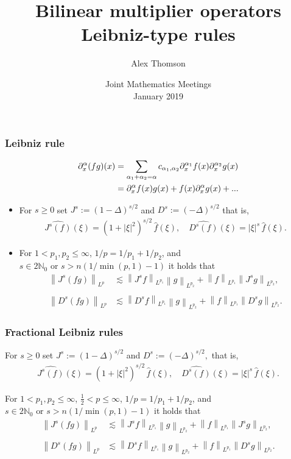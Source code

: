 \documentclass[xcolor=dvipsnames]{beamer}
\title[Leibniz-type rules]{Bilinear multiplier operators Leibniz-type rules}
\author[Alex Thomson]{Alex Thomson}
\institute[Kansas State University]{
Department of Mathematics \\
Kansas State University
 }
\date[January 2019]{Joint Mathematics Meetings\\ January 2019}
\newcommand{\na}{\mathbb{N}}
\newcommand{\fr}[2]{{\textstyle \frac{#1}{#2}}}
\newcommand{\norm}[2]{{\left\| #1 \right\|}_{#2}}
\newcommand{\hcline}{1/p=1/p_1+1/p_2}
\begin{document}
\begin{frame}[plain]
  \titlepage
\end{frame}


\begin{frame}\frametitle{Leibniz rule}
\begin{align*}
\partial^\alpha_x(fg)(x) & = \sum_{\alpha_1 + \alpha_2 = \alpha} c_{\alpha_1,\alpha_2} \partial^{\alpha_1}_x f(x) \partial^{\alpha_2}_x g(x)\\ \medskip
& =\partial^\alpha_x f(x) g(x) + f(x) \partial^\alpha_x g(x) + ...
\end{align*}

\begin{itemize}
\item For $s \ge 0$ set $J^s:=(1-\Delta)^{s/2}$  and  $D^s:=(-\Delta)^{s/2}$ that is,
\begin{align*}
\widehat{J^s(f)}(\xi) =(1+|\xi|^2)^{s/2} \,\hat{f}(\xi),\quad \widehat{D^s(f)}(\xi) =|\xi|^s \,\hat{f}(\xi).
\end{align*}
\item For $1<p_1,p_2\le \infty$, $\hcline$, and $s\in 2\na_0 \text{ or } s>n({1}/{\min(p,1)}-1)$ it holds that \begin{align*}
 \norm{J^s(fg)}{L^p} &\lesssim  \norm{J^sf}{L^{p_1}} \norm{g}{L^{p_2}}+ \norm{f}{L^{p_1}} \norm{J^sg}{L^{p_2}},\\
 &\\
   \norm{D^s(fg)}{L^p} &\lesssim  \norm{D^sf}{L^{p_1}} \norm{g}{L^{p_2}}+ \norm{f}{L^{p_1}} \norm{D^sg}{L^{p_2}}.
\end{align*}
\end{itemize}

\end{frame}



\begin{frame}\frametitle{Fractional Leibniz rules}
For $s \ge 0$ set $J^s:=(1-\Delta)^{s/2}$  and  $D^s:=(-\Delta)^{s/2},$ that is,
\begin{align*}
\widehat{J^s(f)}(\xi) =(1+|\xi|^2)^{s/2} \,\hat{f}(\xi),\quad \widehat{D^s(f)}(\xi) =|\xi|^s \,\hat{f}(\xi).
\end{align*}

\medskip
For $1<p_1,p_2\le \infty$, $\fr{1}{2}<p\le \infty$, $\hcline$, and $s\in 2\na_0 \text{ or } s>n({1}/{\min(p,1)}-1)$ it holds that
\begin{align*}
 \norm{J^s(fg)}{L^p} &\lesssim  \norm{J^sf}{L^{p_1}} \norm{g}{L^{p_2}}+ \norm{f}{L^{p_1}} \norm{J^sg}{L^{p_2}},\\
 &\\
   \norm{D^s(fg)}{L^p} &\lesssim  \norm{D^sf}{L^{p_1}} \norm{g}{L^{p_2}}+ \norm{f}{L^{p_1}} \norm{D^sg}{L^{p_2}}.
\end{align*}
 \end{frame}
\end{document}
